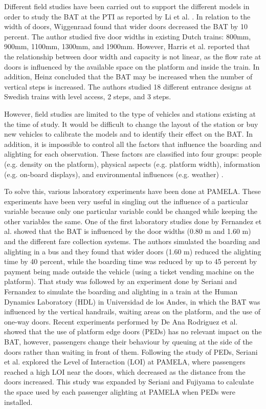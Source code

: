 Different field studies have been carried out to support the different models in order to study the BAT at the PTI as reported by Li et al. \cite{Ref20}. In relation to the width of doors, Wiggenraad \cite{Ref21} found that wider doors decreased the BAT by 10 percent. The author studied five door widths in existing Dutch trains: 800mm, 900mm, 1100mm, 1300mm, and 1900mm. However, Harris et al. \cite{Ref22} reported that the relationship between door width and capacity is not linear, as the flow rate at doors is influenced by the available space on the platform and inside the train. In addition, Heinz \cite{Ref23} concluded that the BAT may be increased when the number of vertical steps is increased. The authors studied 18 different entrance designs at Swedish trains with level access, 2 steps, and 3 steps.

However, field studies are limited to the type of vehicles and stations existing at the time of study. It would be difficult to change the layout of the station or buy new vehicles to calibrate the models and to identify their effect on the BAT. In addition, it is impossible to control all the factors that influence the boarding and alighting for each observation. These factors are classified into four groups: people (e.g. density on the platform), physical aspects (e.g. platform width), information (e.g. on-board displays), and environmental influences (e.g. weather) \cite{Ref24}.

To solve this, various laboratory experiments have been done at PAMELA. These experiments have been very useful in singling out the influence of a particular variable because only one particular variable could be changed while keeping the other variables the same. One of the first laboratory studies done by Fernandez et al. \cite{Ref25} showed that the BAT is influenced by the door widths (0.80 m and 1.60 m) and the different fare collection systems. The authors simulated the boarding and alighting in a bus and they found that wider doors (1.60 m) reduced the alighting time by 40 percent, while the boarding time was reduced by up to 45 percent by payment being made outside the vehicle (using a ticket vending machine on the platform).  That study was followed by an experiment done by Seriani and Fernandez \cite{Ref26} to simulate the boarding and alighting in a train at the Human Dynamics Laboratory (HDL) in Universidad de los Andes, in which the BAT was influenced by the vertical handrails, waiting areas on the platform, and the use of one-way doors. Recent experiments performed by De Ana Rodriguez et al. \cite{Ref27} showed that the use of platform edge doors (PEDs) has no relevant impact on the BAT, however, passengers change their behaviour by queuing at the side of the doors rather than waiting in front of them. Following the study of PEDs, Seriani et al. \cite{Ref28} explored the Level of Interaction (LOI) at PAMELA, where passengers reached a high LOI near the doors, which decreased as the distance from the doors increased. This study was expanded by Seriani and Fujiyama \cite{Ref29} to calculate the space used by each passenger alighting at PAMELA when PEDs were installed.

